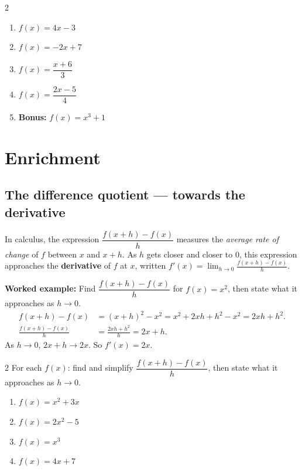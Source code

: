 \documentclass[11pt]{article}
\newcommand{\ans}{\hrulefill}
\newcommand{\anshere}{\par\vspace{0.3em}\noindent\ans\par\vspace{0.3em}}
\begin{document}
\vspace{0.4em}
\begin{multicols}{2}
\begin{enumerate}[label=(\alph*)]
  \item $f(x) = 4x-3$
  \anshere
  \item $f(x) = -2x+7$
  \anshere
  \item $f(x) = \dfrac{x+6}{3}$
  \anshere
  \item $f(x) = \dfrac{2x-5}{4}$
  \anshere
  \item[(e)] \textbf{Bonus:} $f(x) = x^3+1$
  \anshere
\end{enumerate}
\end{multicols}

\newpage

\section*{Enrichment}

\begingroup\small
\subsection*{The difference quotient --- towards the derivative}
\noindent In calculus, the expression $\dfrac{f(x+h)-f(x)}{h}$ measures the \emph{average rate of
change} of $f$ between $x$ and $x+h$. As $h$ gets closer and closer to $0$, this expression
approaches the \textbf{derivative} of $f$ at $x$, written $f'(x) = \displaystyle\lim_{h\to 0}
\frac{f(x+h)-f(x)}{h}$.

\vspace{0.3em}
\noindent\textbf{Worked example:} Find $\dfrac{f(x+h)-f(x)}{h}$ for $f(x)=x^2$, then state what
it approaches as $h\to 0$.
\begin{align*}
  f(x+h)-f(x) &= (x+h)^2-x^2 = x^2+2xh+h^2-x^2 = 2xh+h^2. \\
  \frac{f(x+h)-f(x)}{h} &= \frac{2xh+h^2}{h} = 2x+h.
\end{align*}
As $h\to 0$, $2x+h \to 2x$. So $f'(x) = 2x$.

\vspace{0.4em}
\begin{multicols}{2}
\noindent For each $f(x)$: find and simplify $\dfrac{f(x+h)-f(x)}{h}$, then state what it
approaches as $h\to 0$.
\begin{enumerate}[label=(\alph*)]
  \item $f(x) = x^2+3x$
  \anshere
  \item $f(x) = 2x^2-5$
  \anshere
  \item $f(x) = x^3$
  \anshere
  \item $f(x) = 4x+7$
  \anshere
\end{enumerate}
\end{multicols}
\end{document}
